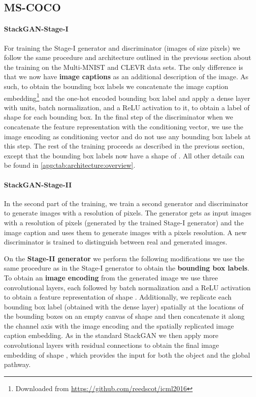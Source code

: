 \documentclass{article} \usepackage{iclr2019_conference,times}
\begin{document}
		
	\subsection{MS-COCO}
	\label{app:mscoco}
	\paragraph{StackGAN-Stage-I}
	For training the Stage-I generator and discriminator (images of size  pixels) we follow the same procedure and architecture outlined in the previous section about the training on the Multi-MNIST and CLEVR data sets.
	The only difference is that we now have \textbf{image captions} as an additional description of the image.
	As such, to obtain the bounding box labels we concatenate the image caption embedding\footnote{Downloaded from \url{https://github.com/reedscot/icml2016}} and the one-hot encoded bounding box label and apply a dense layer with  units, batch normalization, and a ReLU activation to it, to obtain a label of shape  for each bounding box.
	In the final step of the discriminator when we concatenate the feature representation with the conditioning vector, we use the image encoding as conditioning vector and do not use any bounding box labels at this step.
	The rest of the training proceeds as described in the previous section, except that the bounding box labels now have a shape of .
	All other details can be found in \autoref{app:tab:architecture:overview}.
	
	\paragraph{StackGAN-Stage-II} 
	In the second part of the training, we train a second generator and discriminator to generate images with a resolution of  pixels.
	The generator gets as input images with a resolution of  pixels (generated by the trained Stage-I generator) and the image caption and uses them to generate images with a  pixels resolution.
	A new discriminator is trained to distinguish between real and generated images.
	
	On the \textbf{Stage-II generator} we perform the following modifications we use the same procedure as in the Stage-I generator to obtain the \textbf{bounding box labels}.
	To obtain an \textbf{image encoding} from the generated  image we use three convolutional layers, each followed by batch normalization and a ReLU activation to obtain a feature representation of shape .
	Additionally, we replicate each bounding box label (obtained with the dense layer) spatially at the locations of the bounding boxes on an empty canvas of shape  and then concatenate it along the channel axis with the image encoding and the spatially replicated image caption embedding.
	As in the standard StackGAN we then apply more convolutional layers with residual connections to obtain the final image embedding of shape , which provides the input for both the object and the global pathway.
	
\end{document}
